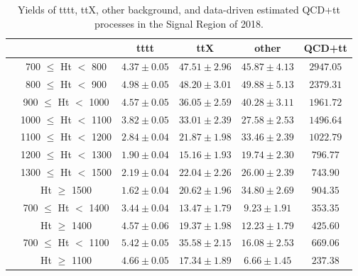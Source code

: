 \documentclass[twoside]{article}
\begin{document}
\begin{table}[h!]
\centering
\begin{adjustbox}{width=\textwidth}
\begin{tabular}{>{\raggedright\arraybackslash}p{3cm}ccccc}
\toprule
 & & \textbf{tttt} & \textbf{ttX} & \textbf{other} & \textbf{QCD+tt} \\
\midrule
\multirow{8}{*}{$N_{RT}=1, N_{BT}=0$} 
 & 700 $\leq$ Ht $<$ 800 & $4.37 \pm 0.05$ & $47.51 \pm 2.96$ & $45.87 \pm 4.13$ & $2947.05$ \\
 & 800 $\leq$ Ht $<$ 900 & $4.98 \pm 0.05$ & $48.20 \pm 3.01$ & $49.88 \pm 5.13$ & $2379.31$ \\
 & 900 $\leq$ Ht $<$ 1000 & $4.57 \pm 0.05$ & $36.05 \pm 2.59$ & $40.28 \pm 3.11$ & $1961.72$ \\
 & 1000 $\leq$ Ht $<$ 1100 & $3.82 \pm 0.05$ & $33.01 \pm 2.39$ & $27.58 \pm 2.53$ & $1496.64$ \\
 & 1100 $\leq$ Ht $<$ 1200 & $2.84 \pm 0.04$ & $21.87 \pm 1.98$ & $33.46 \pm 2.39$ & $1022.79$ \\
 & 1200 $\leq$ Ht $<$ 1300 & $1.90 \pm 0.04$ & $15.16 \pm 1.93$ & $19.74 \pm 2.30$ & $796.77$ \\
 & 1300 $\leq$ Ht $<$ 1500 & $2.19 \pm 0.04$ & $22.04 \pm 2.26$ & $26.00 \pm 2.39$ & $743.90$ \\
 & Ht $\geq$ 1500 & $1.62 \pm 0.04$ & $20.62 \pm 1.96$ & $34.80 \pm 2.69$ & $904.35$ \\
\midrule
\multirow{2}{*}{$N_{RT}=1, N_{BT}\geq1$} 
 & 700 $\leq$ Ht $<$ 1400 & $3.44 \pm 0.04$ & $13.47 \pm 1.79$ & $9.23 \pm 1.91$ & $353.35$ \\
 & Ht $\geq$ 1400 & $4.57 \pm 0.06$ & $19.37 \pm 1.98$ & $12.23 \pm 1.79$ & $425.60$ \\
\midrule
\multirow{2}{*}{$N_{RT}\geq2$} 
 & 700 $\leq$ Ht $<$ 1100 & $5.42 \pm 0.05$ & $35.58 \pm 2.15$ & $16.08 \pm 2.53$ & $669.06$ \\
 & Ht $\geq$ 1100 & $4.66 \pm 0.05$ & $17.34 \pm 1.89$ & $6.66 \pm 1.45$ & $237.38$ \\
\bottomrule
\end{tabular}
\end{adjustbox}
\caption{Yields of tttt, ttX, other background, and data-driven estimated QCD+tt processes in the Signal Region of 2018.}
\label{fig:yield2018}
\end{table}
\end{document}
